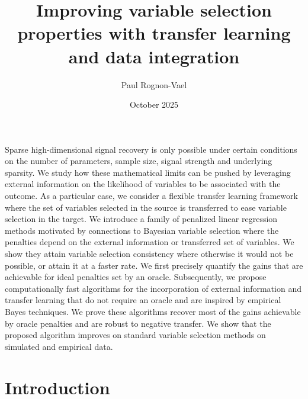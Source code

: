 \documentclass{article}
\title{Improving variable selection properties with transfer learning and data integration}
\author{Paul Rognon-Vael}
\date{October 2025}
\begin{document}
\maketitle
Sparse high-dimensional signal recovery is only possible under certain conditions on the number of parameters, sample size, signal strength and underlying sparsity. We study how these mathematical limits can be pushed by leveraging external information on the likelihood of variables to be associated with the outcome. As a particular case, we consider a flexible transfer learning framework where the set of variables selected in the source is transferred to ease variable selection in the target. We introduce a family of penalized linear regression methods motivated by connections to Bayesian variable selection where the penalties depend on the external information or transferred set of variables. We show they attain variable selection consistency where otherwise it would not be possible, or attain it at a faster rate. We first precisely quantify the gains that are achievable for ideal penalties set by an oracle. Subsequently, we propose computationally fast algorithms for the incorporation of external information and transfer learning that do not require an oracle and are inspired by empirical Bayes techniques. We prove these algorithms recover most of the gains achievable by oracle penalties and are robust to negative transfer. We show that the proposed algorithm improves on standard variable selection methods on simulated and empirical data.

\paul{}

\section{Introduction}
\end{document}
